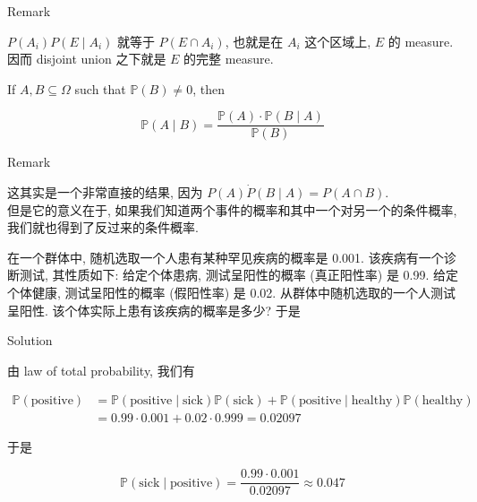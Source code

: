 \begin{qlremark}{Remark}

\(\mathit{P}(\mathit{A}_{\mathit{i}})\mathit{P}(\mathit{E} \mid \mathit{A}_{\mathit{i}})\) 就等于 \(\mathit{P}(\mathit{E} \cap \mathit{A}_{\mathit{i}})\), 也就是在 \(\mathit{A}_{\mathit{i}}\) 这个区域上, \(\mathit{E}\) 的 measure. 因而 disjoint union 之下就是 \(\mathit{E}\) 的完整 measure.

\end{qlremark}

\begin{theorem}{}

If \(\mathit{A},\mathit{B} \subseteq \Omega\) such that \(\mathbb{P}(\mathit{B}) \neq 0\), then

\[\mathbb{P}(\mathit{A} \mid \mathit{B}) = \frac{\mathbb{P}(\mathit{A}) \cdot \mathbb{P}(\mathit{B} \mid \mathit{A})}{\mathbb{P}(\mathit{B})}\]

\end{theorem}

\begin{qlremark}{Remark}

这其实是一个非常直接的结果, 因为 \(\mathit{P}(\mathit{A})\dot{\mathit{P}}(\mathit{B} \mid \mathit{A}) = \mathit{P}(\mathit{A} \cap \mathit{B})\).\\
但是它的意义在于, 如果我们知道两个事件的概率和其中一个对另一个的条件概率, 我们就也得到了反过来的条件概率.

\end{qlremark}

\begin{example}

在一个群体中, 随机选取一个人患有某种罕见疾病的概率是 0.001. 该疾病有一个诊断测试, 其性质如下: 给定个体患病, 测试呈阳性的概率 (真正阳性率) 是 0.99. 给定个体健康, 测试呈阳性的概率 (假阳性率) 是 0.02. 从群体中随机选取的一个人测试呈阳性. 该个体实际上患有该疾病的概率是多少? 于是

\begin{qlsolution}{Solution}

由 law of total probability, 我们有

\[\begin{aligned}
\mathbb{P}(\text{positive}) &= \mathbb{P}(\text{positive} \mid \text{sick})\mathbb{P}(\text{sick}) + \mathbb{P}(\text{positive} \mid \text{healthy})\mathbb{P}(\text{healthy}) \\
 &= 0.99 \cdot 0.001 + 0.02 \cdot 0.999 = 0.02097
\end{aligned}\]

于是

\[\mathbb{P}(\text{sick} \mid \text{positive}) = \frac{0.99 \cdot 0.001}{0.02097} \approx 0.047\]

\end{qlsolution}

\end{example}

